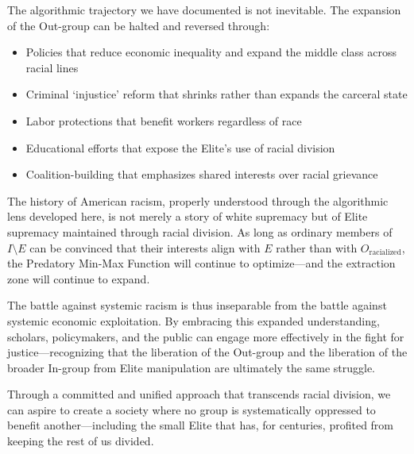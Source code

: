 \documentclass[12pt]{article}
\begin{document}
The algorithmic trajectory we have documented is not inevitable. The expansion of the Out-group can be halted and reversed through:
\begin{itemize}
    \item Policies that reduce economic inequality and expand the middle class across racial lines
    \item Criminal `injustice' reform that shrinks rather than expands the carceral state
    \item Labor protections that benefit workers regardless of race
    \item Educational efforts that expose the Elite's use of racial division
    \item Coalition-building that emphasizes shared interests over racial grievance
\end{itemize}

The history of American racism, properly understood through the algorithmic lens developed here, is not merely a story of white supremacy but of Elite supremacy maintained through racial division. As long as ordinary members of $I \setminus E$ can be convinced that their interests align with $E$ rather than with $O_{\text{racialized}}$, the Predatory Min-Max Function will continue to optimize---and the extraction zone will continue to expand.

The battle against systemic racism is thus inseparable from the battle against systemic economic exploitation. By embracing this expanded understanding, scholars, policymakers, and the public can engage more effectively in the fight for justice---recognizing that the liberation of the Out-group and the liberation of the broader In-group from Elite manipulation are ultimately the same struggle.

Through a committed and unified approach that transcends racial division, we can aspire to create a society where no group is systematically oppressed to benefit another---including the small Elite that has, for centuries, profited from keeping the rest of us divided.
\end{document}
